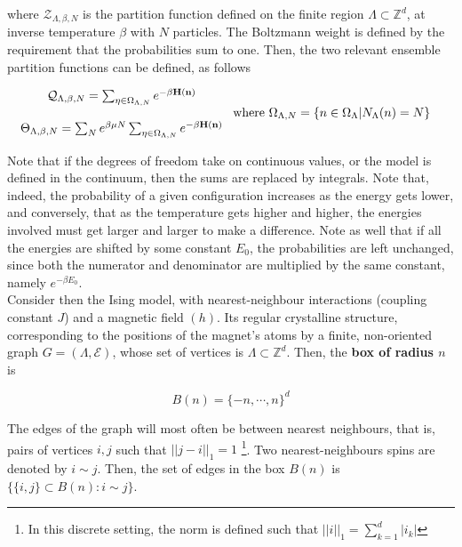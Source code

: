 \documentclass{homework}
\begin{document}
where $\mathcal{Z}_{\Lambda, \beta, N}$ is the partition function defined on the finite region $\Lambda \subset \mathds{Z}^d$, at inverse temperature $\beta$ with $N$ particles. The Boltzmann weight is defined by the requirement that the probabilities sum to one. Then, the two relevant ensemble partition functions can be defined, as follows

\begin{align*}
\begin{array}{c}
    \mathcal{Q}_{\Lambda, \beta, N} = \sum_{\eta \in \Omega_{\Lambda, N}} e^{-\beta {\bf H}({\bf n})} \\
     \\
    \Theta_{\Lambda, \beta, N} = \sum_{N} e^{\beta \mu N} \sum_{\eta \in \Omega_{\Lambda, N}} e^{-\beta {\bf H}({\bf n})} 
\end{array} \textnormal{ where } \Omega_{\Lambda, N} = \{n \in \Omega_{\Lambda} | N_{\Lambda} (n) = N\} & \textnormal{ }
\end{align*}


Note that if the degrees of freedom take on continuous values, or the model is defined in the continuum, then the sums are replaced by integrals. Note that, indeed, the probability of a given configuration increases as the energy gets lower, and conversely, that as the temperature gets higher and higher, the energies involved must get larger and larger to make a difference. Note as well that if all the energies are shifted by some constant $E_0$, the probabilities are left unchanged, since both the numerator and denominator are multiplied by the same constant, namely $e^{-\beta E_0}$. \\


Consider then the Ising model, with nearest-neighbour interactions (coupling constant $J$) and a magnetic field $(h)$. Its regular crystalline structure, corresponding to the positions of the magnet's atoms by a finite, non-oriented graph $G = (\Lambda, \mathcal{E})$, whose set of vertices is $\Lambda \subset \mathds{Z}^d$. Then, the \textbf{box of radius $n$} is 

$$
    B({n}) = \{-n, \cdots, n\}^d
$$

The edges of the graph will most often be between nearest neighbours, that is, pairs of vertices $i, j$ such that $||j-i||_{1} = 1$ \footnote{In this discrete setting, the norm is defined such that $||i||_1 = \sum_{k=1}^d |i_k|$}. Two nearest-neighbours spins are denoted by $i \sim j$. Then, the set of edges in the box $B(n)$ is $\{\{i,j\} \subset B(n) : i \sim j\}$. \\
\end{document}

